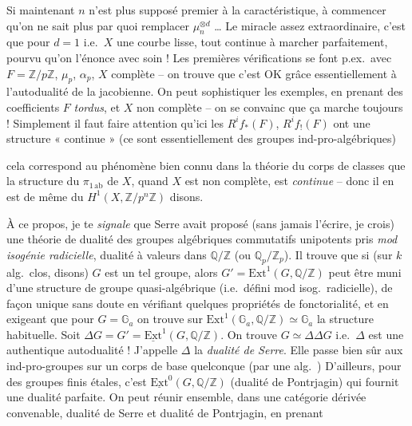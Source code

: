 \documentclass[11pt,a4paper]{article}
\begin{document}
Si maintenant $n$ n'est plus supposé premier à la caractéristique,   à commencer qu'on ne sait plus  par quoi remplacer $\mu_n^{\otimes d}$ … Le miracle assez extraordinaire, c'est que pour $d = 1$ i.e.\ $X$ une courbe lisse, tout continue à marcher parfaitement, pourvu qu'on l'énonce avec soin ! Les premières vérifications se font p.ex.\ avec $F = \mathbb{Z}/p\mathbb{Z}$, $\mu_p$, $\alpha_p$, $X$ complète -- on trouve que c'est OK grâce essentiellement à l'autodualité de la jacobienne. On peut sophistiquer les exemples, en prenant des coefficients $F$ \emph{tordus}, et $X$ non complète -- on se convainc que ça marche toujours ! Simplement il faut faire attention qu'ici les $R^if_*(F)$, $R^if_!(F)$ ont une structure « continue » (ce sont essentiellement des groupes ind-pro-algébriques)

cela correspond au phénomène bien connu dans la théorie du corps de classes que la structure du $\pi_{1\,\mathrm{ab}}$ de $X$, quand $X$ est non complète, est \emph{continue} -- donc il en est de même du $H^1(X, \mathbb{Z}/p^n\mathbb{Z})$ disons.

À ce propos, je te \emph{signale} que Serre avait proposé (sans jamais l'écrire, je crois) une théorie de dualité des groupes algébriques commutatifs unipotents \struck{\ill{}} pris \emph{mod isogénie radicielle}, dualité à valeurs dans $\mathbb{Q}/\mathbb{Z}$ (ou $\mathbb{Q}_p/\mathbb{Z}_p$). Il trouve que si (sur $k$ alg.\ clos, disons) $G$ est un tel groupe, alors $G' = \mathrm{Ext}^1(G, \mathbb{Q}/\mathbb{Z})$ peut être muni d'une structure de groupe quasi-algébrique (i.e.\ défini mod isog.\ radicielle), de façon unique sans doute en vérifiant quelques propriétés de fonctorialité, et en exigeant que pour $G = \mathbb{G}_a$ on trouve sur $\mathrm{Ext}^1(\mathbb{G}_a, \mathbb{Q}/\mathbb{Z}) \simeq \mathbb{G}_a$ la structure habituelle. Soit $\Delta G = G' = \underline{\mathrm{Ext}}^1(G, \mathbb{Q}/\mathbb{Z})$. On trouve $G \simeq \Delta\Delta G$ i.e.\ $\Delta$ est une authentique autodualité ! J'appelle $\Delta$ la \emph{dualité de Serre}. Elle passe bien sûr aux ind-pro-groupes sur un corps de base quelconque (par une alg.\ ) D'ailleurs, pour des groupes finis étales, c'est $\underline{\mathrm{Ext}}^0(G, \mathbb{Q}/\mathbb{Z})$ (dualité de Pontrjagin) qui fournit une dualité parfaite. On peut réunir ensemble, dans une catégorie dérivée convenable, dualité de Serre et dualité de Pontrjagin, en prenant
\end{document}
